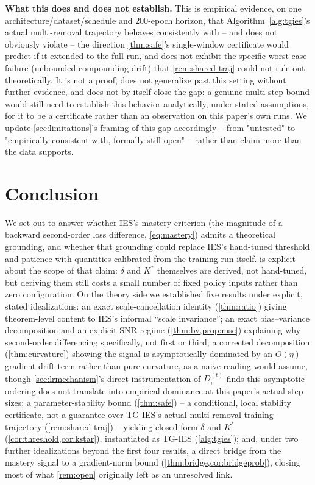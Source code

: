 \documentclass{article}
\theoremstyle{plain}
\theoremstyle{definition}
\theoremstyle{remark}
\begin{document}
\textbf{What this does and does not establish.} This is empirical evidence, on one architecture/dataset/schedule and $200$-epoch horizon, that Algorithm~\ref{alg:tgies}'s actual multi-removal trajectory behaves consistently with -- and does not obviously violate -- the direction \cref{thm:safe}'s single-window certificate would predict if it extended to the full run, and does not exhibit the specific worst-case failure (unbounded compounding drift) that \cref{rem:shared-traj} could not rule out theoretically. It is not a proof, does not generalize past this setting without further evidence, and does not by itself close the gap: a genuine multi-step bound would still need to establish this behavior analytically, under stated assumptions, for it to be a certificate rather than an observation on this paper's own runs. We update \cref{sec:limitations}'s framing of this gap accordingly -- from "untested" to "empirically consistent with, formally still open" -- rather than claim more than the data supports.

\section{Conclusion}
\label{sec:conclusion}

We set out to answer whether IES's mastery criterion (the magnitude of a backward second-order loss difference, \cref{eq:mastery}) admits a theoretical grounding, and whether that grounding could replace IES's hand-tuned threshold and patience with quantities calibrated from the training run itself.  is explicit about the scope of that claim: $\delta$ and $K^*$ themselves are derived, not hand-tuned, but deriving them still costs a small number of fixed policy inputs rather than zero configuration. On the theory side we established five results under explicit, stated idealizations: an exact scale-cancellation identity (\cref{thm:ratio}) giving theorem-level content to IES's informal ``scale invariance''; an exact bias--variance decomposition and an explicit SNR regime (\cref{thm:bv,prop:mse}) explaining why second-order differencing specifically, not first or third; a corrected decomposition (\cref{thm:curvature}) showing the signal is asymptotically dominated by an $O(\eta)$ gradient-drift term rather than pure curvature, as a naive reading would assume, though \cref{sec:lrmechanism}'s direct instrumentation of $D_i^{(t)}$ finds this asymptotic ordering does not translate into empirical dominance at this paper's actual step sizes; a parameter-stability bound (\cref{thm:safe}) -- a conditional, local stability certificate, not a guarantee over TG-IES's actual multi-removal training trajectory (\cref{rem:shared-traj}) -- yielding closed-form $\delta$ and $K^*$ (\cref{cor:threshold,cor:kstar}), instantiated as TG-IES (\cref{alg:tgies}); and, under two further idealizations beyond the first four results, a direct bridge from the mastery signal to a gradient-norm bound (\cref{thm:bridge,cor:bridgeprob}), closing most of what \cref{rem:open} originally left as an unresolved link.
\end{document}
